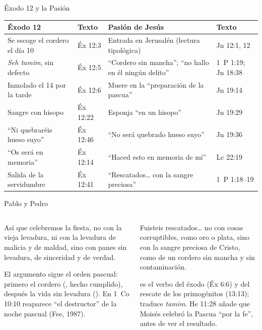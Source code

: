 \begin{frame}{Éxodo 12 y la Pasión}
\scriptsize\renewcommand{\arraystretch}{1.12}
\begin{tabular}{@{}L{3.4cm}L{1.5cm}L{4.8cm}L{1.9cm}@{}}
\toprule
\textbf{Éxodo 12} & \textbf{Texto} & \textbf{Pasión de Jesús} & \textbf{Texto} \\ \midrule
Se escoge el cordero el día 10 & Éx 12:3 & Entrada en Jerusalén (lectura tipológica) & Jn 12:1, 12 \\
\emph{Seh tamim}, sin defecto & Éx 12:5 & ``Cordero sin mancha''; ``no hallo en él ningún delito'' & 1~P 1:19; Jn 18:38 \\
Inmolado el 14 por la tarde & Éx 12:6 & Muere en la ``preparación de la pascua'' & Jn 19:14 \\
Sangre con hisopo & Éx 12:22 & Esponja ``en un hisopo'' & Jn 19:29 \\
``Ni quebraréis hueso suyo'' & Éx 12:46 & ``No será quebrado hueso suyo'' & Jn 19:36 \\
``Os será en memoria'' & Éx 12:14 & ``Haced esto en memoria de mí'' & Lc 22:19 \\
Salida de la servidumbre & Éx 12:41 & ``Rescatados\ldots{} con la sangre preciosa'' & 1~P 1:18--19 \\
\bottomrule
\end{tabular}\par\smallskip
{}
\end{frame}

\begin{frame}{Pablo y Pedro}
\begin{columns}[t,onlytextwidth]
\begin{column}{0.50\textwidth}
\begin{cita}Así que celebremos la fiesta, no con la vieja levadura, ni con la levadura de malicia y de maldad, sino con panes sin levadura, de sinceridad y de verdad.\end{cita}
\scriptsize\RaggedRight El argumento sigue el orden pascual: primero el cordero (, hecho cumplido), después la vida sin levadura (). En 1~Co 10:10 reaparece ``el destructor'' de la noche pascual (Fee, 1987).
\end{column}
\begin{column}{0.48\textwidth}
\begin{cita}Fuisteis rescatados\ldots{} no con cosas corruptibles, como oro o plata, sino con la sangre preciosa de Cristo, como de un cordero sin mancha y sin contaminación.\end{cita}
\scriptsize\RaggedRight {} es el verbo del éxodo (Éx 6:6) y del rescate de los primogénitos (13:13);  traduce \emph{tamim}. He 11:28 añade que Moisés celebró la Pascua ``por la fe'', antes de ver el resultado.
\end{column}
\end{columns}
\end{frame}

